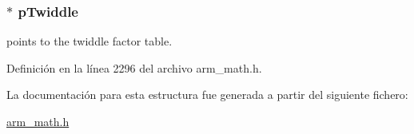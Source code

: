 \subsubsection[{\texorpdfstring{p\+Twiddle}{pTwiddle}}]{$\ast$ p\+Twiddle}\hypertarget{structarm__dct4__instance__q31_a2505b7d5ec077b244c712797a5253b6d}{}\label{structarm__dct4__instance__q31_a2505b7d5ec077b244c712797a5253b6d}
points to the twiddle factor table. 

Definición en la línea 2296 del archivo arm\+\_\+math.\+h.



La documentación para esta estructura fue generada a partir del siguiente fichero\+:\begin{DoxyCompactItemize}
\item 
\hyperlink{arm__math_8h}{arm\+\_\+math.\+h}\end{DoxyCompactItemize}
